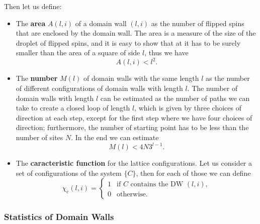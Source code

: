 Then let us define:
\begin{itemize}
  \item The \textbf{area} \(A(l,i)\) of a domain wall \((l,i)\) as the number of flipped spins that are enclosed by the domain wall. The area is a measure of the size of the droplet of flipped spins, and it is easy to show that at it has to be surely smaller than the area of a square of side \(l\), thus we have
        \[
          A(l,i) < l^2.
        \]
  \item The \textbf{number} \(M(l)\) of domain walls with the same length \(l\) as the number of different configurations of domain walls with length \(l\). The number of domain walls with length \(l\) can be estimated as the number of paths we can take to create a closed loop of length \(l\), which is given by three choices of direction at each step, except for the first step where we have four choices of direction; furthermore, the number of starting point has to be less than the number of sites \(N\). In the end we can estimate
        \[
          M(l) < 4 N 3^{l-1}.
        \]
  \item The \textbf{caracteristic function} for the lattice configurations. Let us consider a set of configurations of the system \(\{C\}\), then for each of those we can define
        \[
          \chi_c(l,i) = \begin{cases}
            1 & \text{if } C \text{ contains the DW } (l,i), \\
            0 & \text{otherwise}.
          \end{cases}
        \]
\end{itemize}

\subsubsection{Statistics of Domain Walls}

